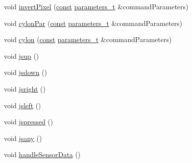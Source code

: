 \begin{DoxyCompactItemize}
\item 
void \hyperlink{class_m_q_t_tsense_h_a_t_ae5172290839c6af0821f41bae9cf30c7}{invert\+Pixel} (\hyperlink{functions__c_8js_afacfd9c985d225bb07483b887a801b6f}{const} \hyperlink{_heater_m_q_t_t_8h_ad3b3bd6544a775cf1e31cd71610c5765}{parameters\+\_\+t} \&command\+Parameters)
\item 
void \hyperlink{class_m_q_t_tsense_h_a_t_a0c2faf77463954149558afc54f965f65}{cylon\+Par} (\hyperlink{functions__c_8js_afacfd9c985d225bb07483b887a801b6f}{const} \hyperlink{_heater_m_q_t_t_8h_ad3b3bd6544a775cf1e31cd71610c5765}{parameters\+\_\+t} \&command\+Parameters)
\item 
void \hyperlink{class_m_q_t_tsense_h_a_t_ad70cc61332aefd376e2fafd026e51144}{cylon} (\hyperlink{functions__c_8js_afacfd9c985d225bb07483b887a801b6f}{const} \hyperlink{_heater_m_q_t_t_8h_ad3b3bd6544a775cf1e31cd71610c5765}{parameters\+\_\+t} \&command\+Parameters)
\item 
void \hyperlink{class_m_q_t_tsense_h_a_t_a5d0f57ce2e94813cfa2279d17e4905ae}{jsup} ()
\item 
void \hyperlink{class_m_q_t_tsense_h_a_t_a49af5e2cafdc045b070601e2046ae32c}{jsdown} ()
\item 
void \hyperlink{class_m_q_t_tsense_h_a_t_a94f4010486bd20e7f1ffd602ab4a6df8}{jsright} ()
\item 
void \hyperlink{class_m_q_t_tsense_h_a_t_ab02c2741dda318559e3f22b85ecd9b28}{jsleft} ()
\item 
void \hyperlink{class_m_q_t_tsense_h_a_t_a4a4c34f1818a47a9e111050cdaf94157}{jspressed} ()
\item 
void \hyperlink{class_m_q_t_tsense_h_a_t_ae4e0f972b1ed819bad5954501b8e2597}{jsany} ()
\item 
void \hyperlink{class_m_q_t_tsense_h_a_t_a86bd30bf5003330703c0eca3d29df629}{handle\+Sensor\+Data} ()
\end{DoxyCompactItemize}
